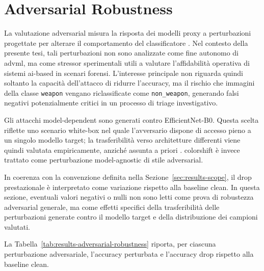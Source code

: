 \section{Adversarial Robustness}
\label{sec:results-adversarial}

La valutazione adversarial misura la risposta dei modelli proxy a perturbazioni
progettate per alterare il comportamento del classificatore
\cite{szegedy2014intriguing,goodfellow2015explaining,biggio2018wild}. Nel
contesto della presente tesi, tali perturbazioni non sono analizzate come fine
autonomo di \gls{advml}, ma come stressor sperimentali utili a valutare
l'affidabilità operativa di sistemi \gls{ai}-based in scenari forensi.
L'interesse principale non riguarda quindi soltanto la capacità dell'attacco di
ridurre l'accuracy, ma il rischio che immagini della classe \texttt{weapon}
vengano riclassificate come \texttt{non\_weapon}, generando falsi negativi
potenzialmente critici in un processo di triage investigativo.

Gli attacchi model-dependent sono generati contro EfficientNet-B0. Questa scelta
riflette uno scenario white-box nel quale l'avversario dispone di accesso pieno a
un singolo modello target; la trasferibilità verso architetture differenti viene
quindi valutata empiricamente, anziché assunta a priori
\cite{biggio2018wild,nowroozi2021survey,barni2018cf}. \gls{colorshift} è invece
trattato come perturbazione model-agnostic di stile adversarial.

In coerenza con la convenzione definita nella
Sezione~\ref{sec:results-scope}, il drop prestazionale è interpretato come
variazione rispetto alla baseline clean. In questa sezione, eventuali valori
negativi o nulli non sono letti come prova di robustezza adversarial generale,
ma come effetti specifici della trasferibilità delle perturbazioni generate
contro il modello target e della distribuzione dei campioni valutati.

La Tabella~\ref{tab:results-adversarial-robustness} riporta, per ciascuna
perturbazione adversariale, l'accuracy perturbata e l'accuracy drop rispetto
alla baseline clean.

